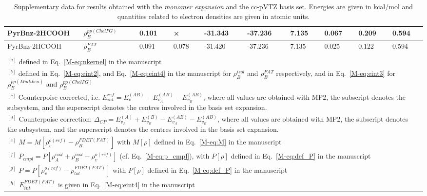 \documentclass[amsmath,amssymb,preprint,aip,jcp]{revtex4-1}
\begin{document}
\begin{table}[H]
\begin{center}
{\begin{tabular}{|l|l|l|l|l|l|l|l|l|l|}
PyrBnz-2HCOOH & $\rho_B^{pp(ChelPG)}$ & 0.101 & × & -31.343 & -37.236 & 7.135 & 0.067 & 0.209 & 0.594\\\hline
PyrBnz-2HCOOH & $\rho_B^{FAT}$ & 0.091 & 0.078 & -31.420 & -37.236 & 7.135 & 0.025 & 0.122 & 0.594\\\hline
\multicolumn{10}{c}{ } \\
\multicolumn{10}{p{1.0\textwidth}}{$^{[a]}$ defined in Eq.~\ref{M-eq:nkernel} in the manuscript}\\
\multicolumn{10}{p{1.0\textwidth}}{$^{[b]}$ defined in Eq.~\ref{M-eq:eint2}, and Eq.~\ref{M-eq:eint4} in the manuscript for $\rho_B^{isol}$ and $\rho_B^{FAT }$ respectively, and in Eq.~\ref{M-eq:eint3} for $\rho_B^{pp(Mulliken)}$ and $\rho_B^{pp(ChelPG)}$}\\
\multicolumn{10}{p{1.0\textwidth}}{$^{[c]}$ Counterpoise corrected, i.e. $E_{int}^{ref} = E_{v}^{(AB)} - E_{v_A}^{(AB)} - E_{v_B}^{(AB)}$, where all values are obtained with MP2, the subscript denotes the subsystem, and the superscript denotes the centres involved in the basis set expansion.} \\
\multicolumn{10}{p{1.0\textwidth}}{$^{[d]}$ Counterpoise correction: $\Delta_{CP} = E_{v_A}^{(A)} + E_{v_B}^{(B)} - E_{v_A}^{(AB)} - E_{v_B}^{(AB)}$, where all values are obtained with MP2, the subscript denotes the subsystem, and the superscript denotes the centres involved in the basis set expansion.} \\
\multicolumn{10}{p{1.0\textwidth}}{$^{[e]}$ $M=M[\rho_v^{o(ref)} - \rho^{FDET(FAT)}_{B}]$ with $M[\rho]$ defined in Eq.~\ref{M-eq:M} in the manuscript}\\
\multicolumn{10}{p{1.0\textwidth}}{$^{[f]}$ $P_{cmpl}=P[\rho_A^{isol}+\rho_B^{isol} - \rho_v^{o(ref)}]$ (cf. Eq.~\ref{M-eq:p_cmpl}), with $P[\rho]$ defined in Eq.~\ref{M-eq:def_P} in the manuscript}\\
\multicolumn{10}{p{1.0\textwidth}}{$^{[g]}$ $P=P[\rho_v^{o(ref)} - \rho_{tot}^{FDET(FAT)}]$ with $P[\rho]$ defined in Eq.~\ref{M-eq:def_P} in the manuscript}\\
\multicolumn{10}{p{1.0\textwidth}}{$^{[h]}$ $E^{FDET(FAT)}_{int}$ is given in Eq.~\ref{M-eq:eint4} in the manuscript}\\
\end{tabular}
}
\end{center}
\caption{Supplementary data for results obtained with the \textit{monomer expansion} and the cc-pVTZ basis set. Energies are given in kcal/mol and quantities related to electron densities are given in atomic units.}
\end{table}
\end{document}
